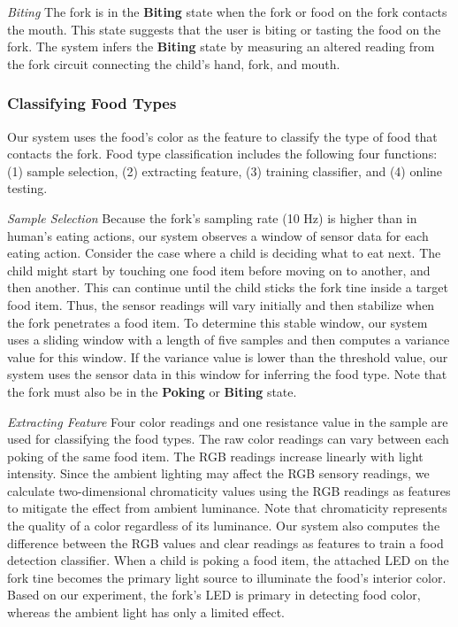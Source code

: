 \textit{Biting}
\newline
The fork is in the \textbf{Biting} state when the fork or food on the fork contacts the mouth. 
This state suggests that the user is biting or tasting the food on the fork. 
The system infers the \textbf{Biting} state by measuring an altered reading 
from the fork circuit connecting the child's hand, fork, and mouth. 

\subsubsection{Classifying Food Types}
Our system uses the food's color as the feature to classify the type of food that contacts the fork. 
Food type classification includes the following four functions:
(1) sample selection, (2) extracting feature, (3) training classifier, and (4) online testing. 

\textit{Sample Selection}
\newline
Because the fork's sampling rate (10 Hz) is higher 
than in human's eating actions, 
our system observes a window of sensor data for each eating action. 
Consider the case where a child is deciding what to eat next. 
The child might start by touching one food item before moving on to another, and then another. 
This can continue until the child sticks the fork tine inside a target food item. 
Thus, the sensor readings will vary initially and then stabilize when the fork penetrates a food item. 
To determine this stable window, 
our system uses a sliding window with a length of five samples and then computes a variance value for this window. 
If the variance value is lower than the threshold value, 
our system uses the sensor data in this window for inferring the food type. 
Note that the fork must also be in the \textbf{Poking} or \textbf{Biting} state. 

\textit{Extracting Feature}
\newline
Four color readings and one resistance value 
in the sample are used for classifying the food types. 
The raw color readings can vary between each poking of the same food item. 
The RGB readings increase linearly with light intensity. 
Since the ambient lighting may affect the RGB sensory readings, 
we calculate two-dimensional chromaticity values \cite{Broadbent:2004} using the RGB readings 
as features to mitigate the effect from ambient luminance. 
Note that chromaticity represents the quality of a color regardless of its luminance. 
Our system also computes the difference between the RGB values and clear readings 
as features to train a food detection classifier. 
When a child is poking a food item, the attached LED on the fork tine becomes the primary light source 
to illuminate the food's interior color. 
Based on our experiment, the fork's LED is primary in detecting food color, 
whereas the ambient light has only a limited effect. 

